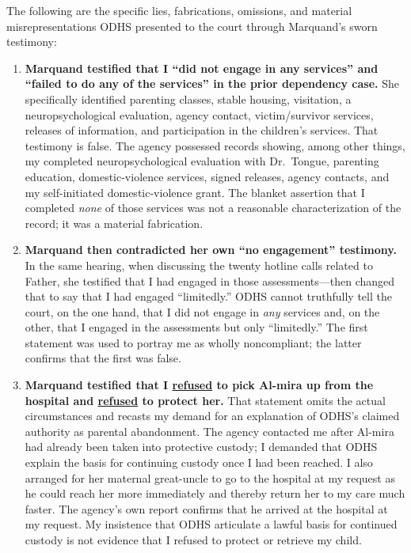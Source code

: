 \documentclass[10pt,a4paper,roman]{moderncv}
\begin{document}
	\noindent The following are the specific lies, fabrications, omissions, and material misrepresentations ODHS presented to the court through Marquand's sworn testimony:
	\begin{enumerate}[label=\arabic*., leftmargin=0.5in, itemsep=0.85em]
		
		\item \textbf{Marquand testified that I ``did not engage in any services'' and ``failed to do any of the services'' in the prior dependency case.} She specifically identified parenting classes, stable housing, visitation, a neuropsychological evaluation, agency contact, victim/survivor services, releases of information, and participation in the children's services. That testimony is false. The agency possessed records showing, among other things, my completed neuropsychological evaluation with Dr.~Tongue, parenting education, domestic-violence services, signed releases, agency contacts, and my self-initiated domestic-violence grant. The blanket assertion that I completed \emph{none} of those services was not a reasonable characterization of the record; it was a material fabrication.
		
		\item \textbf{Marquand then contradicted her own ``no engagement'' testimony.} In the same hearing, when discussing the twenty hotline calls related to Father, she testified that I had engaged in those assessments---then changed that to say that I had engaged ``limitedly.'' ODHS cannot truthfully tell the court, on the one hand, that I did not engage in \emph{any} services and, on the other, that I engaged in the assessments but only ``limitedly.'' The first statement was used to portray me as wholly noncompliant; the latter confirms that the first was false.
		
		\item \textbf{Marquand testified that I \underline{refused} to pick Al-mira up from the hospital and \underline{refused} to protect her.} That statement omits the actual circumstances and recasts my demand for an explanation of ODHS's claimed authority as parental abandonment. The agency contacted me after Al-mira had already been taken into protective custody; I demanded that ODHS explain the basis for continuing custody once I had been reached. I also arranged for her maternal great-uncle to go to the hospital at my request as he could reach her more immediately and thereby return her to my care much faster. The agency's own report confirms that he arrived at the hospital at my request. My insistence that ODHS articulate a lawful basis for continued custody is not evidence that I refused to protect or retrieve my child.
		

\end{enumerate}
\end{document}
